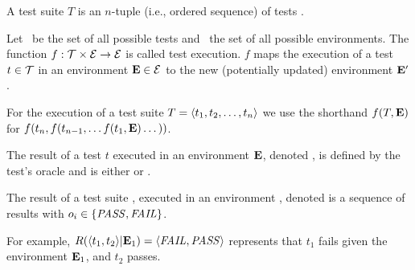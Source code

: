 \begin{definition}
A test suite\/ $T$ is an $n$-tuple (i.e., ordered sequence) of tests
.

\end{definition}

\begin{definition}
Let\/ \alltests\ be the set of all possible
tests and\/ \environs\ the set of all possible
environments.
The function\/ ${f}: \mathcal{T} \times \mathcal{E} \rightarrow
\mathcal{E}$ is called test
execution. $f$ maps the execution of a test\/ $ t \in
\mathcal{T}$ 
in an environment\/ $\mathbf{E} \in \mathcal{E}$ to the new (potentially updated)
environment\/ $\mathbf{E}'$.

For the execution of a test suite\/ $T =  \langle t_1, t_2, \dots, t_n \rangle $
we use the shorthand\/
$f(T,\mathbf{E})$ for $f(t_n,f(t_{n-1},\dots f(t_1,\mathbf{E}) \dots ))$.
\end{definition}

\begin{definition}
The result of a test $t$ executed in an environment\/ $\mathbf{E}$,
denoted\/ , is defined by the test's oracle
and is either \pass or \fail.

The result of a test suite\/ , executed in an
environment\/ \env, denoted\/  is a
sequence of results\/  with $o_i \in \{\mathit{PASS},\mathit{FAIL}\}$.


For example, $R( \langle t_1, t_2 \rangle |\mathbf{E}_1) =  \langle \mathit{FAIL}, \mathit{PASS} \rangle $ represents that 
$t_1$ fails given the environment\/ $\mathbf{E}_1$, and\/ $t_2$ passes.
\end{definition}




